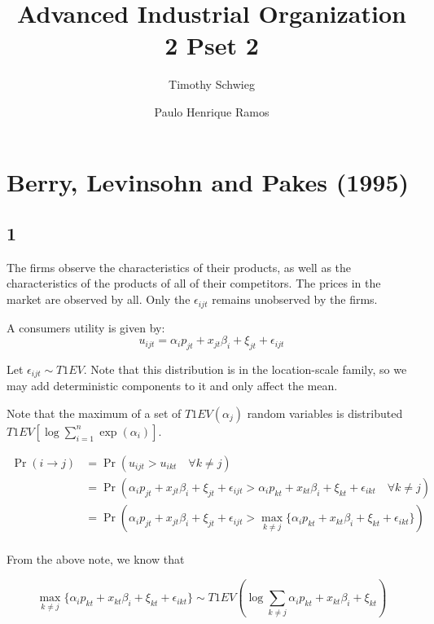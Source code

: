\documentclass[12pt]{paper}
\title{Advanced Industrial Organization 2 Pset 2}
\author{Timothy Schwieg \and Paulo Henrique Ramos}
\begin{document}
\maketitle

\section{Berry, Levinsohn and Pakes (1995)}

\subsection{1}



The firms observe the characteristics of their products, as well as
the characteristics of the products of all of their competitors. The
prices in the market are observed by all. Only the $\epsilon_{ijt}$ remains
unobserved by the firms. 

A consumers utility is given by:
\begin{equation*}
  u_{ijt} = \alpha_i p_{jt} + x_{jt} \beta_i + \xi_{jt} + \epsilon_{ijt}
\end{equation*}

Let $\epsilon_{ijt} \sim T1EV$. Note that this distribution is in the
location-scale family, so we may add deterministic components to it
and only affect the mean.

Note that the maximum of a set of $T1EV ( \alpha_j)$ random variables is
distributed $T1EV\left[ \log \sum_{i=1}^n \exp (\alpha_i) \right]$.

\begin{align*}
  \Pr( i \rightarrow j) &= \Pr( u_{ijt} > u_{ikt} \quad \forall k \neq j)\\
  &= \Pr( \alpha_i p_{jt} + x_{jt} \beta_i + \xi_{jt} + \epsilon_{ijt} > \alpha_i p_{kt} + x_{kt}
    \beta_i + \xi_{kt} + \epsilon_{ikt} \quad \forall k \neq j )\\
  &= \Pr( \alpha_i p_{jt} + x_{jt} \beta_i + \xi_{jt} + \epsilon_{ijt} > \max_{k \neq j} \{ \alpha_i p_{kt} + x_{kt}
    \beta_i + \xi_{kt} + \epsilon_{ikt}\} )\\
\end{align*}

From the above note, we know that

\begin{equation*}
  \max_{k \neq j} \{ \alpha_i p_{kt} + x_{kt} \beta_i + \xi_{kt} + \epsilon_{ikt}\} \sim T1EV(
  \log \sum_{k \neq j} \alpha_i p_{kt} + x_{kt} \beta_i + \xi_{kt}) 
\end{equation*}
\end{document}
